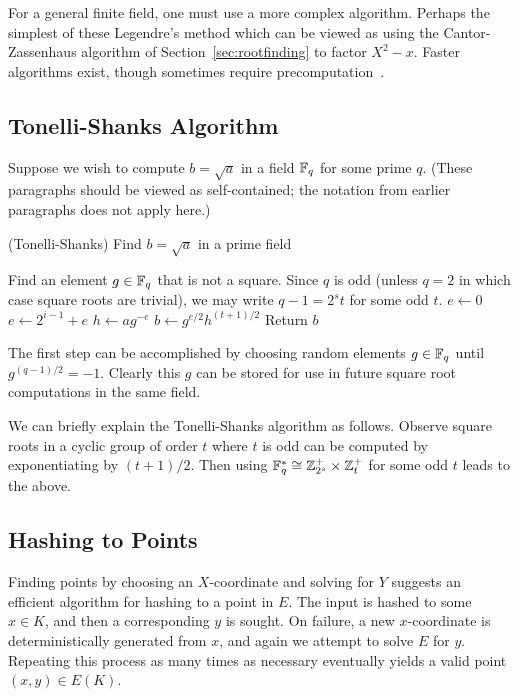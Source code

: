 For a general finite field,
one must use a more complex algorithm. Perhaps the simplest of these
Legendre's method which can be viewed as using
the Cantor-Zassenhaus algorithm
of Section~\ref{sec:rootfinding} to factor $X^2 - x$.
Faster algorithms exist, though sometimes require precomputation~\cite{djb}.

\subsection {Tonelli-Shanks Algorithm}

Suppose we wish to compute $b = \sqrt{a}$ in
a field $\mathbb{F}_q$ for some prime $q$. (These paragraphs should be viewed
as self-contained; the notation from earlier paragraphs does not apply here.)

\begin{algorithm}
\caption{(Tonelli-Shanks) Find $b =\sqrt{a}$ in a prime field}
\begin{algorithmic}[1]
\STATE Find an element $g \in \mathbb{F}_q$ that is not a square.
\STATE Since $q$ is odd (unless $q = 2$ in which case square roots are trivial),
we may write $q - 1 = 2^s t$ for some odd $t$.
\STATE $e \gets 0$
\STATE $e \gets 2^{i-1} + e$
\ENDIF
\ENDFOR
\STATE $h \gets ag^{-e}$
\STATE $b \gets g^{e/2} h^{(t+1)/2}$
\STATE Return $b$
\end{algorithmic}
\end{algorithm}

The first step can be accomplished
by choosing random elements $g \in\mathbb{F}_q$ until $g^{(q-1)/2} = -1$. 
Clearly this $g$ can be stored for use in future square root computations
in the same field.

We can briefly explain the Tonelli-Shanks algorithm as follows.
Observe square roots in a cyclic group of order $t$ where $t$ is odd can be
computed by exponentiating by $(t+1)/2$.
Then using $\mathbb{F}_q^* \cong \mathbb{Z}_{2^s}^+
\times \mathbb{Z}_t^+$ for some odd $t$ leads to the above.

\subsection {Hashing to Points}

Finding points by choosing an $X$-coordinate and solving for $Y$
suggests an efficient algorithm for hashing to a point in $E$.
The input is hashed to some $x \in K$, and then a corresponding $y$ is sought.
On failure, a new $x$-coordinate is deterministically generated from $x$,
and again we attempt to solve $E$ for $y$. Repeating this process as many
times as
necessary eventually yields a valid point $(x,y) \in E(K)$.

